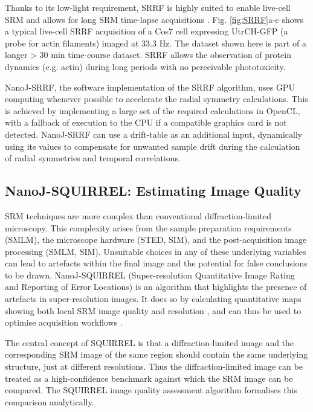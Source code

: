  Thanks to its low-light requirement, SRRF is highly suited to enable live-cell SRM and allows for long SRM time-lapse acquisitions \cite{culley2018srrf}. Fig. \ref{fig:SRRF}a-c shows a typical live-cell SRRF acquisition of a Cos7 cell expressing UtrCH-GFP (a probe for actin filaments) imaged at 33.3 Hz. The dataset shown here is part of a longer > 30 min time-course dataset. SRRF allows the observation of protein dynamics (e.g. actin) during long periods with no perceivable phototoxicity. 
 
 NanoJ-SRRF, the software implementation of the SRRF algorithm, uses GPU computing whenever possible to accelerate the radial symmetry calculations. This is achieved by implementing a large set of the required calculations in OpenCL, with a fallback of execution to the CPU if a compatible graphics card is not detected. NanoJ-SRRF can use a drift-table as an additional input, dynamically using its values to compensate for unwanted sample drift during the calculation of radial symmetries and temporal correlations.

\subsection*{NanoJ-SQUIRREL: Estimating Image Quality}
SRM techniques are more complex than conventional diffraction-limited microscopy. This complexity arises from the sample preparation requirements (SMLM), the microscope hardware (STED, SIM), and the post-acquisition image processing (SMLM, SIM). Unsuitable choices in any of these underlying variables can lead to artefacts within the final image and the potential for false conclusions to be drawn. NanoJ-SQUIRREL (Super-resolution Quantitative Image Rating and Reporting of Error Locations) is an algorithm that highlights the presence of artefacts in super-resolution images. It does so by calculating quantitative maps showing both local SRM image quality and resolution \cite{culley2018quantitative}, and can thus be used to optimise acquisition workflows \cite{culley2018srrf}.

 The central concept of SQUIRREL is that a diffraction-limited image and the corresponding SRM image of the same region should contain the same underlying structure, just at different resolutions. Thus the diffraction-limited image can be treated as a high-confidence benchmark against which the SRM image can be compared. The SQUIRREL image quality assessment algorithm formalises this comparison analytically.

